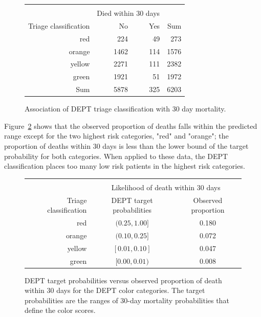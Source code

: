 \begin{figure}[ht]
\centering
\begin{tabular}{rrrr}
  \hline \\
  & \multicolumn{2}{c}{Died within 30 days} & \\
Triage classification & No & Yes & Sum \\
  \hline
red & 224 & 49 & 273 \\
  orange & 1462 & 114 & 1576 \\
  yellow & 2271 & 111 & 2382 \\
  green & 1921 & 51 & 1972 \\
  Sum & 5878 & 325 & 6203 \\
   \hline
\end{tabular}
\caption{Association of DEPT triage classification with
       30 day mortality.}
\label{figure:triageMort30Table}
\end{figure}

Figure~\ref{figure:predVsObsTriageMort30Table} shows that the observed proportion of deaths falls within the predicted range except for the two highest risk categories, "red" and "orange"; the proportion of deaths within 30 days is less than the lower bound of the target probability for both categories.  When applied to these data, the DEPT classification places too many low risk patients in the highest risk categories.

\begin{figure}[ht]
\centering
\begin{tabular}{rcc}
  \hline \\
  & \multicolumn{2}{c}{Likelihood of death within 30 days} \\
Triage classification & DEPT target probabilities & Observed proportion  \\
  \hline
red & $(0.25, 1.00]$ & 0.180   \\
orange & $(0.10, 0.25]$ & 0.072   \\
yellow & $[0.01, 0.10]$ & 0.047   \\
green & $[0.00, 0.01)$ & 0.008   \\
   \hline
\end{tabular}
\caption{DEPT target probabilities  versus observed proportion of death within 30 days for the DEPT color categories. The target probabilities are the ranges of 30-day mortality probabilities that define the color scores.} 
\label{figure:predVsObsTriageMort30Table}
\end{figure}

